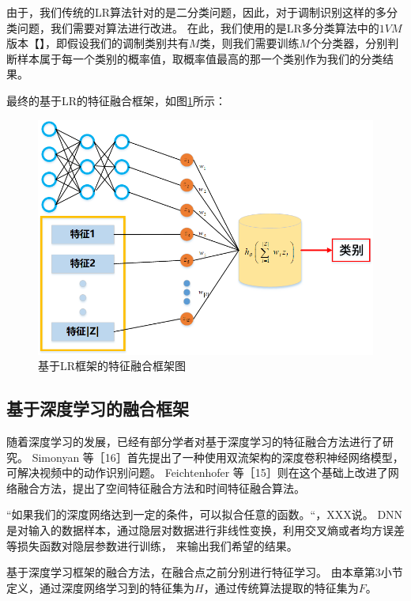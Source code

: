 由于，我们传统的LR算法针对的是二分类问题，因此，对于调制识别这样的多分类问题，我们需要对算法进行改进。
在此，我们使用的是LR多分类算法中的$1VM$版本【】，即假设我们的调制类别共有$M$类，则我们需要训练$M$个分类器，分别判断样本属于每一个类别的概率值，取概率值最高的那一个类别作为我们的分类结果。\par
最终的基于LR的特征融合框架，如图\ref{sec:fig_4_2}所示：
\begin{figure}[!h]
	\centering
	\includegraphics[scale=0.7]{figures/chapter_4/LR_combile}
	\caption{基于LR框架的特征融合框架图}\label{sec:fig_4_2}
\end{figure}


\subsection{基于深度学习的融合框架}
随着深度学习的发展，已经有部分学者对基于深度学习的特征融合方法进行了研究。
Simonyan 等［16］首先提出了一种使用双流架构的深度卷积神经网络模型，可解决视频中的动作识别问题。
Feichtenhofer 等［15］则在这个基础上改进了网络融合方法，提出了空间特征融合方法和时间特征融合算法。\par

“如果我们的深度网络达到一定的条件，可以拟合任意的函数。“，XXX说。
DNN是对输入的数据样本，通过隐层对数据进行非线性变换，利用交叉熵或者均方误差等损失函数对隐层参数进行训练，
来输出我们希望的结果。\par

基于深度学习框架的融合方法，在融合点之前分别进行特征学习。
由本章第3小节定义，通过深度网络学习到的特征集为$H$，通过传统算法提取的特征集为$F$。\par

